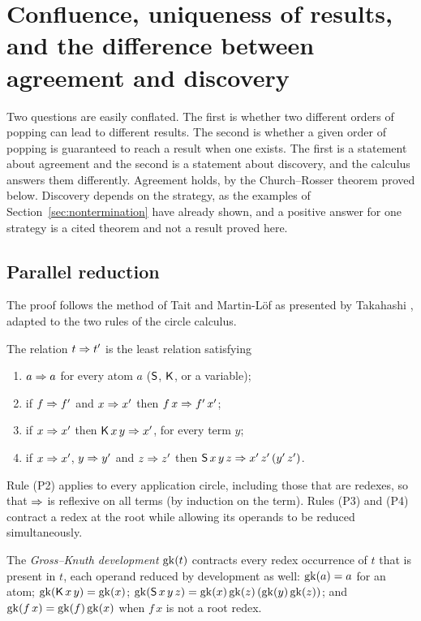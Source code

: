 \section{Confluence, uniqueness of results, and the difference between agreement and discovery}\label{sec:confluence}

Two questions are easily conflated. The first is whether two different orders of popping can lead to different results. The second is whether a given order of popping is guaranteed to reach a result when one exists. The first is a statement about agreement and the second is a statement about discovery, and the calculus answers them differently. Agreement holds, by the Church--Rosser theorem proved below. Discovery depends on the strategy, as the examples of Section~\ref{sec:nontermination} have already shown, and a positive answer for one strategy is a cited theorem and not a result proved here.

\subsection{Parallel reduction}

The proof follows the method of Tait and Martin-L\"of as presented by Takahashi \cite{takahashi}, adapted to the two rules of the circle calculus.

\begin{definition}\label{def:parallel}
The relation $t\Rightarrow t'$ is the least relation satisfying
\begin{enumerate}[label=(P\arabic*)]
\item $a\Rightarrow a$ for every atom $a$ ($\mathsf{S}$, $\mathsf{K}$, or a variable);
\item if $f\Rightarrow f'$ and $x\Rightarrow x'$ then $f\,x\Rightarrow f'\,x'$;
\item if $x\Rightarrow x'$ then $\mathsf{K}\,x\,y\Rightarrow x'$, for every term $y$;
\item if $x\Rightarrow x'$, $y\Rightarrow y'$ and $z\Rightarrow z'$ then $\mathsf{S}\,x\,y\,z\Rightarrow x'\,z'\,(y'\,z')$.
\end{enumerate}
\end{definition}

Rule (P2) applies to every application circle, including those that are redexes, so that $\Rightarrow$ is reflexive on all terms (by induction on the term). Rules (P3) and (P4) contract a redex at the root while allowing its operands to be reduced simultaneously.

\begin{definition}\label{def:gk}
The \emph{Gross--Knuth development} $\mathrm{gk}(t)$ contracts every redex occurrence of $t$ that is present in $t$, each operand reduced by development as well: $\mathrm{gk}(a)=a$ for an atom; $\mathrm{gk}(\mathsf{K}\,x\,y)=\mathrm{gk}(x)$; $\mathrm{gk}(\mathsf{S}\,x\,y\,z)=\mathrm{gk}(x)\,\mathrm{gk}(z)\,(\mathrm{gk}(y)\,\mathrm{gk}(z))$; and $\mathrm{gk}(f\,x)=\mathrm{gk}(f)\,\mathrm{gk}(x)$ when $f\,x$ is not a root redex.
\end{definition}

